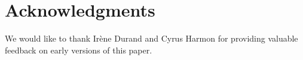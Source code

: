 \section{Acknowledgments} 

We would like to thank Irène Durand and Cyrus Harmon for providing
valuable feedback on early versions of this paper.
